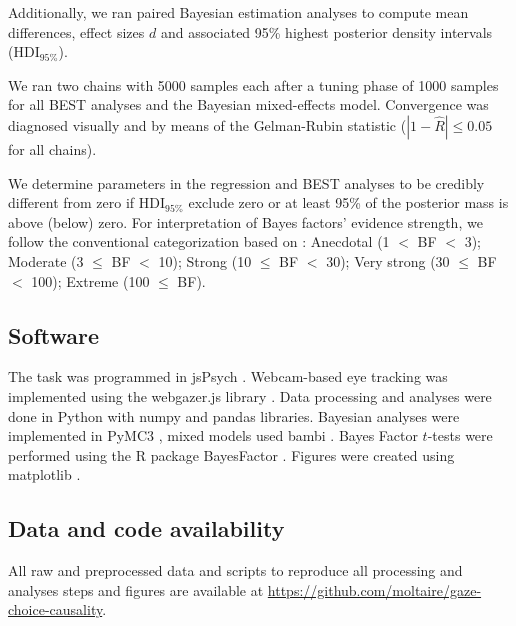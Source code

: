 \documentclass[11pt, a4paper, twocolumn, abstract]{scrartcl}
\begin{document}
Additionally, we ran paired Bayesian estimation \parencite[BEST;][]{kruschke2013BayesianEstimationSupersedes,kruschke2014DoingBayesianData} analyses to compute mean differences, effect sizes $d$ and associated 95\% highest posterior density intervals (HDI$_{95\%}$).

We ran two chains with 5000 samples each after a tuning phase of 1000 samples for all BEST analyses and the Bayesian mixed-effects model. Convergence was diagnosed visually and by means of the Gelman-Rubin statistic ($|1 - \hat{R}| \le 0.05$ for all chains).

We determine parameters in the regression and BEST analyses to be credibly different from zero if HDI$_{95\%}$ exclude zero or at least 95\% of the posterior mass is above (below) zero.
For interpretation of Bayes factors' evidence strength, we follow the conventional categorization based on \textcite{jeffreys1998TheoryProbability}: Anecdotal (1 $<$ BF $<$ 3); Moderate (3 $\le$ BF $<$ 10); Strong (10 $\le$ BF $<$ 30); Very strong (30 $\le$ BF $<$ 100); Extreme (100 $\le$ BF).


\subsection*{Software}
The task was programmed in jsPsych \parencite{deleeuw2015JsPsychJavaScriptLibrary}. Webcam-based eye tracking was implemented using the webgazer.js library \parencite{papoutsaki2016webgazer}.
Data processing and analyses were done in Python with numpy \parencite{harris2020array} and pandas \parencite{mckinney2012PythonDataAnalysis} libraries. Bayesian analyses were implemented in PyMC3 \parencite{salvatier2016ProbabilisticProgrammingPython}, mixed models used bambi \parencite{capretto2021BambiSimpleInterface}. Bayes Factor $t$-tests were performed using the R package BayesFactor \parencite[]{morey2018BayesFactorComputation}. Figures were created using matplotlib \parencite{hunter2007Matplotlib2DGraphics}.

\subsection*{Data and code availability}
All raw and preprocessed data and scripts to reproduce all processing and analyses steps and figures are available at \url{https://github.com/moltaire/gaze-choice-causality}.

\renewcommand*{\bibfont}{\small}
\printbibliography
\end{document}
